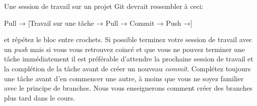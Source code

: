\documentclass{article}
\begin{document}
Une session de travail sur un projet Git devrait ressembler à ceci:

\noindent Pull → [Travail sur une tâche → Pull → Commit → Push →]

\noindent et répétez le bloc entre crochets. Si possible terminez votre session de travail avec un \emph{push} mais si vous vous retrouvez coincé et que vous ne pouvez terminer une tâche immédiatement il est préférable d'attendre la prochaine session de travail et la complétion de la tâche avant de créer un nouveau \emph{commit}. Complétez toujours une tâche avant d'en commencer une autre, à moins que vous ne soyez familier avec le principe de branches. Nous vous enseignerons comment créer des branches plus tard dans le cours.
\end{document}
